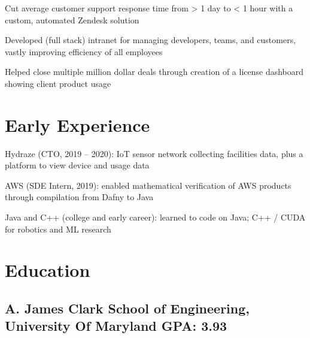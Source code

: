 \documentclass[print]{jack-resume}
\begin{document}
\begin{tightemize}
    \item Cut average customer support response time from > 1 day to < 1 hour with a custom, automated Zendesk solution
    \item Developed (full stack) intranet for managing developers, teams, and customers, vastly improving efficiency of all employees
    \item Helped close multiple million dollar deals through creation of a license dashboard showing client product usage
\end{tightemize}
\sectionsep

\section{Early Experience}
\vspace{1.4em}
\begin{tightemize}
    \item Hydraze (CTO, 2019 -- 2020): IoT sensor network collecting facilities data, plus a platform to view device and usage data
    \item AWS (SDE Intern, 2019): enabled mathematical verification of AWS products through compilation from Dafny to Java
    \item Java and C++ (college and early career): learned to code on Java; C++ / CUDA for robotics and ML research
\end{tightemize}
\sectionsep

\section{Education}
\subsection{A. James Clark School of Engineering, University Of Maryland \hfill GPA: 3.93}

\begin{minipage}[t]{0.04\textwidth}
    \hfill
\end{minipage}
\end{document}
